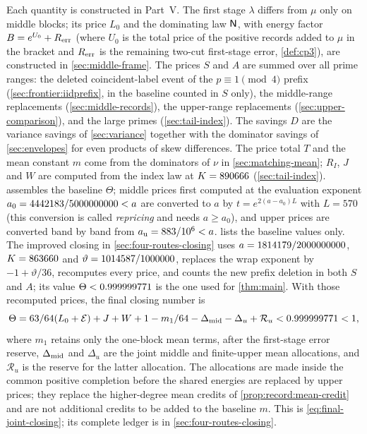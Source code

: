 Each quantity is constructed in Part~V. The first stage $\lambda$
differs from $\mu$ only on middle blocks; its price $L_0$ and the
dominating law $\mathsf N$, with energy factor $B=e^{U_0}+R_{\rm err}$
(where $U_0$ is the total price of the positive records added to
$\mu$ in the bracket and $R_{\rm err}$ is the remaining two-cut
first-stage error, \cref{def:cp3}), are
constructed in \cref{sec:middle-frame}. The prices $S$ and $A$ are
summed over all prime ranges: the deleted coincident-label event of
the $p\equiv1\pmod4$ prefix (\cref{sec:frontier:iidprefix}, in the
baseline counted in $S$ only), the middle-range replacements
(\cref{sec:middle-records}), the upper-range replacements
(\cref{sec:upper-comparison}), and the large primes
(\cref{sec:tail-index}). The savings $D$ are the variance savings of
\cref{sec:variance} together with the dominator savings of
\cref{sec:envelopes} for even products of skew differences. The
price total $T$ and the mean constant $m$ come from the dominators
of $\nu$ in \cref{sec:matching-mean}; $R_I$, $J$ and $W$ are computed
from the index law at $K=890666$ (\cref{sec:tail-index}).
 assembles the baseline $\Theta$; middle prices
first computed at the evaluation exponent $a_0=4442183/5000000000<a$ are
converted to $a$ by $t=e^{2(a-a_0)L}$ with $L=570$ (this conversion
is called \emph{repricing} and needs $a\ge a_0$), and upper prices
are converted band by band from $a_{\rm u}=883/10^6<a$.
 lists the baseline values only. The improved
closing in \cref{sec:four-routes-closing} uses
$a=1814179/2000000000$, $K=863660$ and
$\vartheta=1014587/1000000$, replaces the wrap exponent by
$-1+\vartheta/36$, recomputes every price, and counts the new prefix
deletion in both $S$ and $A$; its value
$\Theta<0.999999771$ is the one used for \cref{thm:main}.
With those recomputed prices, the final closing number is
\[
 \Theta=63/64(L_0+\mathcal E)+J+W+
 1-m_1/64-\Delta_{\rm mid}-\Delta_u+\mathcal R_u
 <0.999999771<1,
\]
where $m_1$ retains only the one-block mean terms, after the
first-stage error reserve, $\Delta_{\rm mid}$ and $\Delta_u$ are the
joint middle and finite-upper mean allocations, and $\mathcal R_u$
is the reserve for the latter allocation. The allocations are made
inside the common positive completion before the shared energies are
replaced by upper prices; they replace the higher-degree mean credits
of \cref{prop:record:mean-credit} and are not additional credits to
be added to the baseline $m$. This is
\eqref{eq:final-joint-closing}; its complete ledger is in
\cref{sec:four-routes-closing}.

